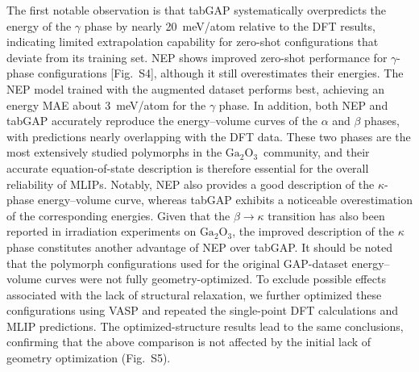 \documentclass[aip,graphicx,amsmath,amssymb]{revtex4-1}
\newcommand{\ga}{$\text{Ga}_2\text{O}_3$}
\begin{document}
The first notable observation is that tabGAP systematically overpredicts the energy of
the $\gamma$ phase by nearly 20~meV/atom relative to the DFT results, indicating limited
extrapolation capability for zero-shot configurations that deviate from its training set.
NEP shows improved zero-shot performance for $\gamma$-phase configurations
[Fig.~S4], although it still overestimates their energies.
The NEP model trained with the augmented dataset performs best, achieving an energy MAE
about 3~meV/atom for the $\gamma$ phase.
In addition, both NEP and tabGAP accurately reproduce the energy--volume curves of the
$\alpha$ and $\beta$ phases, with predictions nearly overlapping with the DFT data.
These two phases are the most extensively studied polymorphs in the \ga\ community, and
their accurate equation-of-state description is therefore essential for the overall
reliability of MLIPs.
Notably, NEP also provides a good description of the $\kappa$-phase energy--volume curve,
whereas tabGAP exhibits a noticeable overestimation of the corresponding energies.
Given that the $\beta \to \kappa$ transition has also been reported in irradiation
experiments on \ga,\cite{han_electronic_2025} the improved description of the $\kappa$
phase constitutes another advantage of NEP over tabGAP.
It should be noted that the polymorph configurations used for the original GAP-dataset
energy--volume curves were not fully geometry-optimized.
To exclude possible effects associated with the lack of structural relaxation, we further optimized
these configurations using VASP and repeated the single-point DFT calculations and MLIP predictions.
The optimized-structure results lead to the same conclusions, confirming that the above comparison
is not affected by the initial lack of geometry optimization (Fig.~S5).
\end{document}
